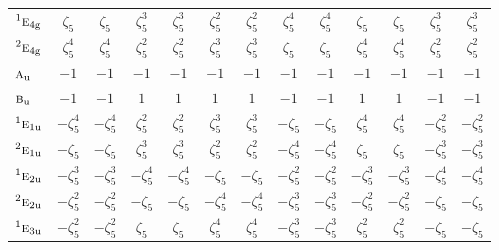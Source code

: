 \documentclass[10pt,a4paper]{article}
\numberwithin{equation}{section}
\newcommand{\irr}[1]{\text{\normalfont\scshape #1}}
\newcommand{\conjpair}[1]{{}^{#1}}
\newcommand{\ptag}[1]{\mathrm{#1}}
\newcommand{\rootunity}[1]{\zeta_{#1}}
\begin{document}
{\begin{longtable}{@{}lcccccccccccc@{}}
$\conjpair{1}\irr{e}_{4\ptag{g}}$ & $\rootunity{5}$ & $\rootunity{5}$ & $\rootunity{5}^{3}$ & $\rootunity{5}^{3}$ & $\rootunity{5}^{2}$ & $\rootunity{5}^{2}$ & $\rootunity{5}^{4}$ & $\rootunity{5}^{4}$ & $\rootunity{5}$ & $\rootunity{5}$ & $\rootunity{5}^{3}$ & $\rootunity{5}^{3}$\\
$\conjpair{2}\irr{e}_{4\ptag{g}}$ & $\rootunity{5}^{4}$ & $\rootunity{5}^{4}$ & $\rootunity{5}^{2}$ & $\rootunity{5}^{2}$ & $\rootunity{5}^{3}$ & $\rootunity{5}^{3}$ & $\rootunity{5}$ & $\rootunity{5}$ & $\rootunity{5}^{4}$ & $\rootunity{5}^{4}$ & $\rootunity{5}^{2}$ & $\rootunity{5}^{2}$\\
$\irr{a}_{\ptag{u}}$ & $-1$ & $-1$ & $-1$ & $-1$ & $-1$ & $-1$ & $-1$ & $-1$ & $-1$ & $-1$ & $-1$ & $-1$\\
$\irr{b}_{\ptag{u}}$ & $-1$ & $-1$ & $1$ & $1$ & $1$ & $1$ & $-1$ & $-1$ & $1$ & $1$ & $-1$ & $-1$\\
$\conjpair{1}\irr{e}_{1\ptag{u}}$ & $-\rootunity{5}^{4}$ & $-\rootunity{5}^{4}$ & $\rootunity{5}^{2}$ & $\rootunity{5}^{2}$ & $\rootunity{5}^{3}$ & $\rootunity{5}^{3}$ & $-\rootunity{5}$ & $-\rootunity{5}$ & $\rootunity{5}^{4}$ & $\rootunity{5}^{4}$ & $-\rootunity{5}^{2}$ & $-\rootunity{5}^{2}$\\
$\conjpair{2}\irr{e}_{1\ptag{u}}$ & $-\rootunity{5}$ & $-\rootunity{5}$ & $\rootunity{5}^{3}$ & $\rootunity{5}^{3}$ & $\rootunity{5}^{2}$ & $\rootunity{5}^{2}$ & $-\rootunity{5}^{4}$ & $-\rootunity{5}^{4}$ & $\rootunity{5}$ & $\rootunity{5}$ & $-\rootunity{5}^{3}$ & $-\rootunity{5}^{3}$\\
$\conjpair{1}\irr{e}_{2\ptag{u}}$ & $-\rootunity{5}^{3}$ & $-\rootunity{5}^{3}$ & $-\rootunity{5}^{4}$ & $-\rootunity{5}^{4}$ & $-\rootunity{5}$ & $-\rootunity{5}$ & $-\rootunity{5}^{2}$ & $-\rootunity{5}^{2}$ & $-\rootunity{5}^{3}$ & $-\rootunity{5}^{3}$ & $-\rootunity{5}^{4}$ & $-\rootunity{5}^{4}$\\
$\conjpair{2}\irr{e}_{2\ptag{u}}$ & $-\rootunity{5}^{2}$ & $-\rootunity{5}^{2}$ & $-\rootunity{5}$ & $-\rootunity{5}$ & $-\rootunity{5}^{4}$ & $-\rootunity{5}^{4}$ & $-\rootunity{5}^{3}$ & $-\rootunity{5}^{3}$ & $-\rootunity{5}^{2}$ & $-\rootunity{5}^{2}$ & $-\rootunity{5}$ & $-\rootunity{5}$\\
$\conjpair{1}\irr{e}_{3\ptag{u}}$ & $-\rootunity{5}^{2}$ & $-\rootunity{5}^{2}$ & $\rootunity{5}$ & $\rootunity{5}$ & $\rootunity{5}^{4}$ & $\rootunity{5}^{4}$ & $-\rootunity{5}^{3}$ & $-\rootunity{5}^{3}$ & $\rootunity{5}^{2}$ & $\rootunity{5}^{2}$ & $-\rootunity{5}$ & $-\rootunity{5}$\\

\end{longtable}}
\end{document}
